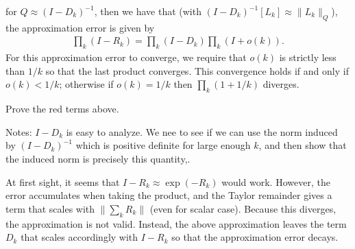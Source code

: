 for {\color{red}$Q \approx (I - D_k)^{-1}$}, then we have that {\color{red}(with $(I - D_k)^{-1} [L_k] \approx \lVert L_k \rVert_Q$)}, the approximation error is given by
\begin{align*}
    \prod_k (I - R_k) = \prod_k (I - D_k) \prod_k (I + o(k)) .
\end{align*}
For this approximation error to converge, we require that $o(k)$ is strictly less than $1/k$ so that the last product converges.
This convergence holds if and only if $o(k) < 1/k$; otherwise if $o(k) = 1/k$ then $\prod_k (1+1/k)$ diverges. 

{\color{red}Prove the red terms above.}

{\color{blue}Notes: $I - D_k$ is easy to analyze. 
We nee to see if we can use the norm induced by $(I - D_k)^{-1}$ which is positive definite for large enough $k$, and then show that the induced norm is precisely this quantity,.
}




\begin{remark}
    At first sight, it seems that $I - R_k \approx \exp(-R_k)$ would work. 
    However, the error accumulates when taking the product, and the Taylor remainder gives a term that scales with $\lVert \sum_k R_k \rVert$ (even for scalar case). 
    Because this diverges, the approximation is not valid.
    Instead, the above approximation leaves the term $D_k$ that scales accordingly with $I - R_k$ so that the approximation error decays.
\end{remark}

